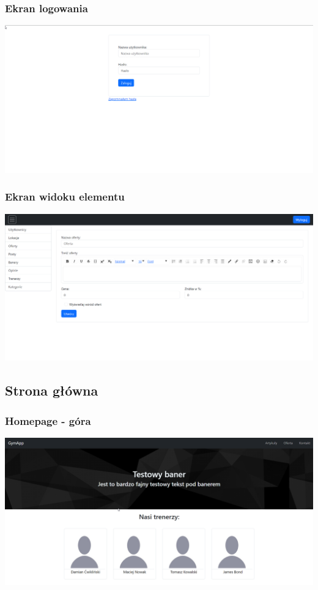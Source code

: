 \documentclass[12pt]{article}
\begin{document}
\subsubsection{Ekran logowania}
\includegraphics[width=1\textwidth, angle=0]{images/Interface_login.png}
\subsubsection{Ekran widoku elementu}
\includegraphics[width=1\textwidth, angle=0]{images/Interface_view.png}

\subsection{Strona główna}
\subsubsection{Homepage - góra}
\includegraphics[width=1\textwidth, angle=0]{images/Interface_main1.png}
\end{document}
